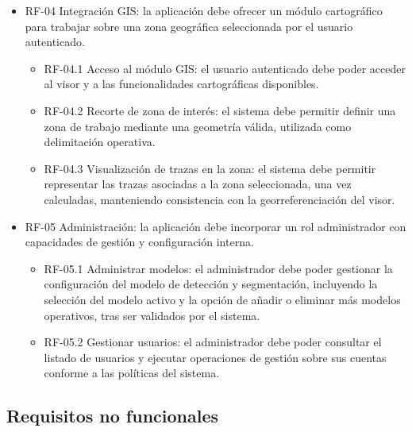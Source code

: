 \begin{itemize}
	\item RF-04 Integración GIS: la aplicación debe ofrecer un módulo cartográfico para trabajar sobre una zona geográfica seleccionada por el usuario autenticado.
	\begin{itemize}
		\item RF-04.1 Acceso al módulo GIS: el usuario autenticado debe poder acceder al visor y a las funcionalidades cartográficas disponibles.
		\item RF-04.2 Recorte de zona de interés: el sistema debe permitir definir una zona de trabajo mediante una geometría válida, utilizada como delimitación operativa.
		\item RF-04.3 Visualización de trazas en la zona: el sistema debe permitir representar las trazas asociadas a la zona seleccionada, una vez calculadas, manteniendo consistencia con la georreferenciación del visor.
	\end{itemize}
	
	\item RF-05 Administración: la aplicación debe incorporar un rol administrador con capacidades de gestión y configuración interna.
	\begin{itemize}
		\item RF-05.1 Administrar modelos: el administrador debe poder gestionar la configuración del modelo de detección y segmentación, incluyendo la selección del modelo activo y la opción de añadir o eliminar más modelos operativos, tras ser validados por el sistema.
		\item RF-05.2 Gestionar usuarios: el administrador debe poder consultar el listado de usuarios y ejecutar operaciones de gestión sobre sus cuentas conforme a las políticas del sistema.
	\end{itemize}
\end{itemize}

\subsection{Requisitos no funcionales}

